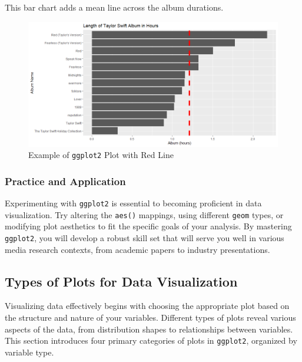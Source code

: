 \documentclass[
]{book}
\begin{document}
This bar chart adds a mean line across the album durations.

\begin{figure}
\centering
\includegraphics[width=1\textwidth,height=\textheight]{images/ggplot2_example2.png}
\caption{Example of \texttt{ggplot2} Plot with Red Line}
\end{figure}

\subsubsection*{Practice and Application}\label{practice-and-application}

Experimenting with \texttt{ggplot2} is essential to becoming proficient in data visualization. Try altering the \texttt{aes()} mappings, using different \texttt{geom} types, or modifying plot aesthetics to fit the specific goals of your analysis. By mastering \texttt{ggplot2}, you will develop a robust skill set that will serve you well in various media research contexts, from academic papers to industry presentations.

\subsection*{Types of Plots for Data Visualization}\label{types-of-plots-for-data-visualization}

Visualizing data effectively begins with choosing the appropriate plot based on the structure and nature of your variables. Different types of plots reveal various aspects of the data, from distribution shapes to relationships between variables. This section introduces four primary categories of plots in \texttt{ggplot2}, organized by variable type.
\end{document}
